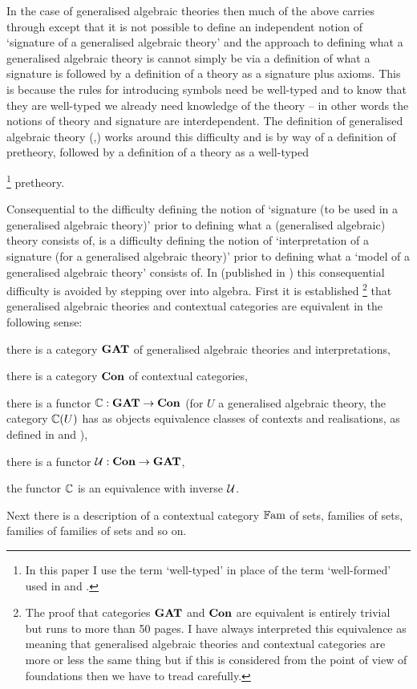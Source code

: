 In the case of generalised algebraic theories then much of the above carries through except that
it is not possible to define an independent notion of `signature of a generalised algebraic theory' and
the approach to defining what a generalised algebraic theory is cannot simply be via a definition of what a signature is followed by a definition 
of a theory  as a signature plus axioms. This is because the rules for introducing symbols need be well-typed and to know that
they are well-typed we already need knowledge of the theory -- in other words the notions of theory and signature are interdependent. 
The  definition of generalised algebraic theory (\cite{Cartmell78},\cite{Cartmell86})  works around this difficulty and is by way of 
a definition of pretheory, 
followed by a definition of a theory as a well-typed{\footnote{In this paper I use the term `well-typed' in place of the term `well-formed' used in \cite{Cartmell78} and \cite{Cartmell86}.} pretheory. 

Consequential to the difficulty defining the notion of `signature
(to be used in a generalised algebraic theory)' prior to defining
what a (generalised algebraic) theory consists of, is  a difficulty defining the notion of `interpretation of a signature (for a generalised algebraic theory)' prior to 
defining what a `model of a generalised algebraic theory' consists of.  In \cite{Cartmell78} (published in \cite{Cartmell86}) this consequential difficulty is avoided by stepping over into algebra.
First  it is established \footnote{
The proof that categories $\catGAT$ and $\catCon$ are equivalent  is entirely trivial but runs to more than 50 pages. I have always interpreted this equivalence as meaning that generalised algebraic theories and contextual categories are more or less the same thing but if this is considered from the point of view of foundations then we have to tread carefully.} 
that  generalised algebraic theories and contextual categories are equivalent in the following sense: 
\noindent \label{ccgatequivalence}
\begin{point}
there is a category $\catGAT$ of generalised algebraic theories and interpretations,
\end{point}
\begin{point}
there is a category $\catCon$ of contextual categories,
\end{point}
\begin{point}
there is a functor $\ccat[C]: \catGAT \morph \catCon$  (for $U$ a generalised algebraic theory, the category $\ccat[C](U)$ 
has as objects equivalence classes of contexts and realisations, as defined 
in \cite{Cartmell78} and  \cite{Cartmell86}), 
\end{point}
\begin{point}
there is a functor $\gat[U]:\catCon \morph \catGAT$,
\end{point}
\begin{point}
the functor $\ccat[C]$ is an equivalence with inverse $\gat[U]$.
\end{point}
Next there is a description of
a contextual category $\Fam$ of sets, families of sets, families of families of sets and so on. 

}
